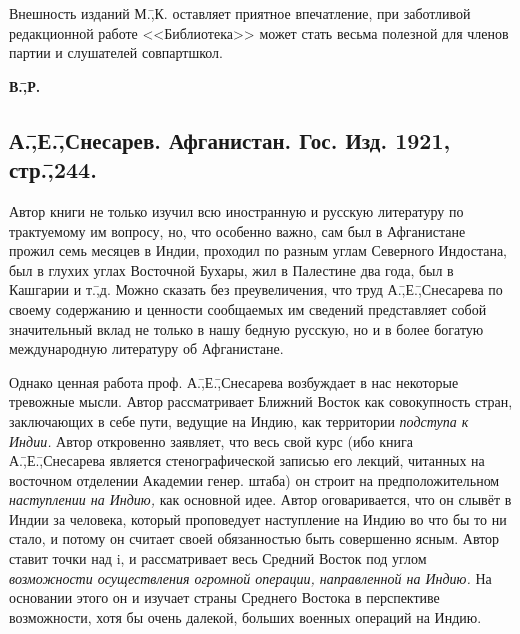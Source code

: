 Внешность изданий М.\=,К. оставляет приятное впечатление, при заботливой редакционной работе <<Библиотека>> может стать весьма полезной для членов партии и слушателей совпартшкол.

\begin{flushright}
 \textbf{В.\=,Р.}\hspace*{2em}
\end{flushright}

\subsection*{А.\=,Е.\=,Снесарев. Афганистан. Гос. Изд. 1921, стр.\=,244.}
\label{subsec:10.8}

Автор книги не только изучил всю иностранную и русскую литературу по трактуемому им вопросу, но, что особенно важно, сам был в Афганистане прожил семь месяцев в Индии, проходил по разным углам Северного Индостана, был в глухих углах Восточной Бухары, жил в Палестине два года, был в Кашгарии и т.\=,д. Можно сказать без преувеличения, что труд А.\=,Е.\=,Снесарева по своему содержанию и ценности сообщаемых им сведений представляет собой значительный вклад не только в нашу бедную русскую, но и в более богатую международную литературу об Афганистане.

Однако ценная работа проф. А.\=,Е.\=,Снесарева возбуждает в нас некоторые тревожные мысли. Автор рассматривает Ближний Восток как совокупность стран, заключающих в себе пути, ведущие на Индию, как территории \emph{подступа к Индии.} Автор откровенно заявляет, что весь свой курс (ибо книга А.\=,Е.\=,Снесарева является стенографической записью его лекций, читанных на восточном отделении Академии генер. штаба) он строит на предположительном \emph{наступлении на Индию,} как основной идее. Автор оговаривается, что он слывёт в Индии за человека, который проповедует наступление на Индию во что бы то ни стало, и потому он считает своей обязанностью быть совершенно ясным. Автор ставит точки над i, и рассматривает весь Средний Восток под углом \emph{возможности осуществления огромной операции, направленной на Индию.} На основании этого он и изучает страны Среднего Востока в перспективе возможности, хотя бы очень далекой, больших военных операций на Индию.

